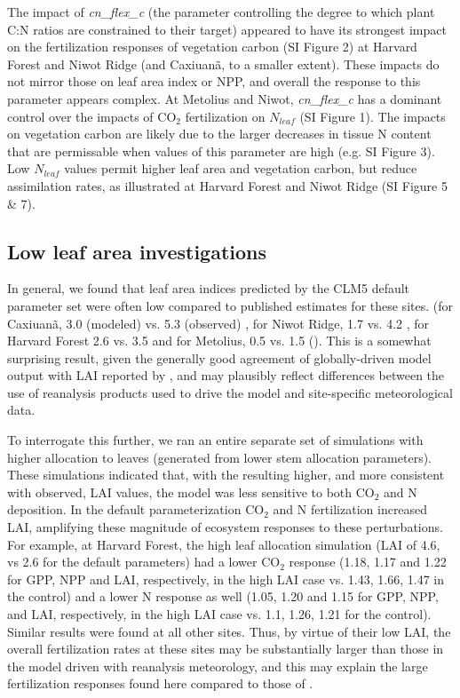 \documentclass[draft,linenumbers]{agujournal}
\begin{document}
The impact of \emph{cn\_flex\_c} (the parameter controlling the degree to which plant C:N ratios are constrained to their target) appeared to have its strongest impact on the fertilization responses of vegetation carbon (SI Figure 2)  at Harvard Forest and Niwot Ridge (and Caxiuan\~a, to a smaller extent). These impacts do not mirror those on leaf area index or NPP, and overall the response to this parameter appears complex.  At Metolius and Niwot, \emph{cn\_flex\_c} has a dominant control over the impacts of CO$_{2}$ fertilization on $N_{leaf}$ (SI Figure 1).  The impacts on vegetation carbon are likely due to the larger decreases in tissue N content that are permissable when values of this parameter are high (e.g. SI Figure 3).  Low  $N_{leaf}$ values permit higher leaf area and vegetation carbon, but reduce assimilation rates, as illustrated at Harvard Forest and Niwot Ridge (SI Figure 5 \& 7).  

\subsection{Low leaf area investigations}
In general, we found that leaf area indices predicted by the CLM5 default parameter set were often low  compared to published estimates for these sites. (for Caxiuan\~a, 3.0 (modeled) vs. 5.3 (observed) \cite{fisher2007}, for Niwot Ridge, 1.7 vs. 4.2 \cite{bowling2009}, for Harvard Forest 2.6 vs. 3.5 \cite{williams1996} and for Metolius, 0.5 vs. 1.5 (\cite{spadavecchia2011}). This is a somewhat surprising result, given the generally good agreement of globally-driven model output with LAI reported by \cite{lawrence2018}, and may plausibly reflect differences between the use of reanalysis products used to drive the model and site-specific meteorological data. 

To interrogate this further, we ran an entire separate set of simulations with higher allocation to leaves (generated from lower stem allocation parameters). These simulations indicated that, with the resulting higher, and more consistent with observed, LAI values, the model was less sensitive to both CO$_{2}$ and N deposition. In the default parameterization CO$_{2}$ and N fertilization increased LAI, amplifying these magnitude of ecosystem responses to these perturbations. For example, at Harvard Forest, the high leaf allocation simulation (LAI of 4.6, vs 2.6 for the default parameters) had a lower CO$_{2}$ response (1.18, 1.17 and 1.22 for GPP, NPP and LAI, respectively, in the high LAI case vs. 1.43, 1.66, 1.47 in the control) and a lower N response as well (1.05, 1.20 and 1.15 for GPP, NPP, and LAI, respectively, in the high LAI case vs. 1.1, 1.26, 1.21 for the control). Similar results were found at all other sites.  Thus, by virtue of their low LAI, the overall fertilization rates at these sites may be substantially larger than those in the model driven with reanalysis meteorology, and this may explain the large fertilization responses found here compared to those of \cite{wieder2019}. 
\end{document}
